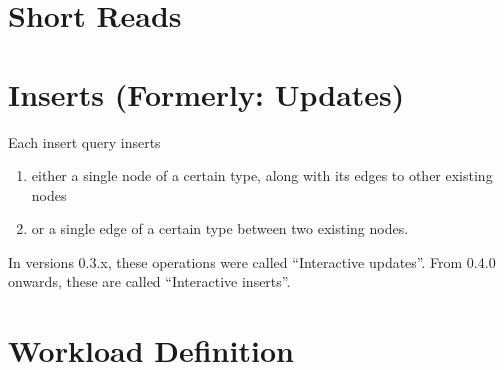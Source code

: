 \section{Short Reads}
\label{sec:interactive-short-reads}




\section{Inserts (Formerly: Updates)}
\label{sec:interactive-inserts}

Each insert query inserts

\begin{enumerate}
    \item either a single node of a certain type, along with its edges to other existing nodes
    \item or a single edge of a certain type between two existing nodes.
\end{enumerate}
In versions 0.3.x, these operations were called ``Interactive updates''.
From 0.4.0 onwards, these are called ``Interactive inserts''.



\section{Workload Definition}
\label{sec:interactive-workload-definition}


